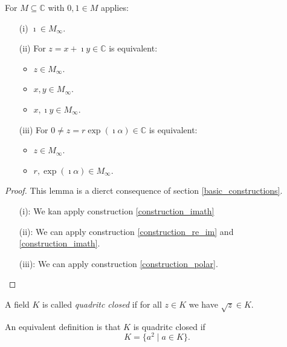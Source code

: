 \begin{lemma}
    For $M\subseteq \mathbb{C}$ with $0,1 \in M$ applies:
    \begin{itemize}
        \item[(i)] $\imath \in M_{\infty}$.
        \item[(ii)] For $z = x + \imath y \in \mathbb{C}$ is equivalent:
            \begin{itemize}
                \item $z \in M_{\infty}$.
                \item $x, y \in M_{\infty}$.
                \item $x, \imath y \in M_{\infty}$.
            \end{itemize}
        \item[(iii)] 
            For $0 \ne z = r \exp(\imath \alpha) \in \mathbb{C}$ is equivalent:
            \begin{itemize}
                \item $z \in M_{\infty}$.
                \item $r,\exp(\imath \alpha) \in M_{\infty}$.
            \end{itemize}
    \end{itemize}
\end{lemma}
\begin{proof}
    This lemma is a dierct consequence of section \ref{basic_constructions}.
    \begin{itemize}
        \item[(i):] We kan apply construction \ref{construction_imath}
        \item[(ii):] We can apply construction \ref{construction_re_im} and \ref{construction_imath}.
        \item[(iii):]  We can apply construction \ref{construction_polar}.
    \end{itemize}
\end{proof}

\begin{definition}
    A field $K$ is called \emph{quadritc closed} if for all $z \in K$ we have $\sqrt{z} \in K$.
\end{definition}
\begin{remark}
    An equivalent definition is that $K$ is quadritc closed if $$K=\{a^2\mid a \in K\}.$$ 
\end{remark}

